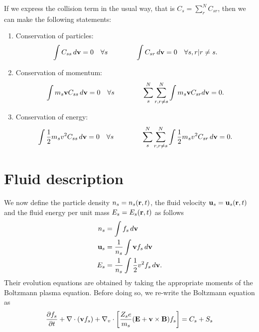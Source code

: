 \documentclass[a4paper,11pt]{report}
\begin{document}
If we express the collision term in the usual way, that is $C_s = \sum_r^N C_{s r}$, then we can make the following statements:
\begin{enumerate}
\item Conservation of particles:
\begin{equation}
    \label{eq:coll_cons_particles}
    \int C_{ss} \, d\mathbf{v} = 0 \quad \forall s \qquad \qquad
    \int C_{sr} \,d\mathbf{v} = 0 \quad \forall s, r | r \ne s.
\end{equation}

\item Conservation of momentum:
\begin{equation}
    \label{eq:coll_cons_momentum}
    \int m_s \mathbf{v} C_{ss} \, d\mathbf{v} = 0 \quad \forall s \qquad \qquad \sum_s^N \sum_{r, r \ne s}^N \int m_s \mathbf{v} C_{sr} d\mathbf{v} = 0.
\end{equation}

\item Conservation of energy:
\begin{equation}
    \label{eq:coll_cons_energy}
    \int \frac{1}{2} m_s v^2 C_{ss} \, d\mathbf{v} = 0 \quad \forall s \qquad \qquad \sum_s^N \sum_{r, r \ne s}^N \int \frac{1}{2} m_s v^2 C_{sr} \, d\mathbf{v} = 0.
\end{equation}

\end{enumerate}

\section{Fluid description}
\label{sec:gov_eqs_fluid_description}

We now define the particle density $n_s = n_s(\mathbf{r},t)$, the fluid velocity $\mathbf{u}_s = \mathbf{u}_s(\mathbf{r},t)$ and the fluid energy per unit mass $E_s = E_s(\mathbf{r},t)$ as follows
\begin{align}
n_s &= \int f_s \, d\mathbf{v} \\
\mathbf{u}_s &= \frac{1}{n_s} \int \mathbf{v} f_s \, d\mathbf{v} \\
E_s &= \frac{1}{n_s} \int \frac{1}{2} v^2 f_s \, d\mathbf{v}.
\end{align}
Their evolution equations are obtained by taking the appropriate moments of the Boltzmann plasma equation. Before doing so, we re-write the Boltzmann equation as
\begin{equation}
\label{eq:boltz_mod}
\frac{\partial f_s}{\partial t} + \nabla \cdot (\mathbf{v} f_s) + \nabla_v \cdot \left [ \frac{Z_s e}{m_s} ( \mathbf{E} + \mathbf{v} \times \mathbf{B} ) f_s \right ] = C_s + S_s
\end{equation}
\end{document}
